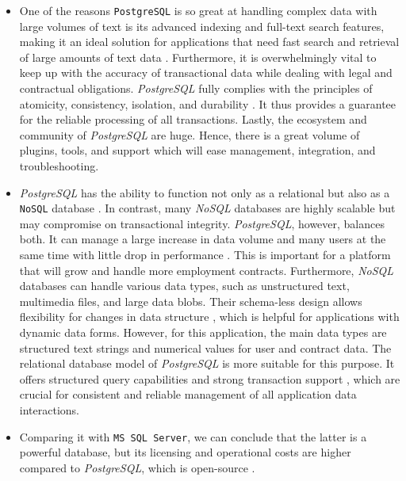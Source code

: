 \begin{itemize}
    \item One of the reasons \texttt{PostgreSQL} is so great at handling complex data with large volumes of text is its advanced indexing and full-text search features, making it an ideal solution for applications that need fast search and retrieval of large amounts of text data \cite{WorsleyEtAl2002}. Furthermore, it is overwhelmingly vital to keep up with the accuracy of transactional data while dealing with legal and contractual obligations. \textit{PostgreSQL} fully complies with the principles of atomicity, consistency, isolation, and durability \cite{JubaEtAl2015}. It thus provides a guarantee for the reliable processing of all transactions. Lastly, the ecosystem and community of \textit{PostgreSQL} are huge. Hence, there is a great volume of plugins, tools, and support \cite{FotacheEtAl2013} which will ease management, integration, and troubleshooting. 
    \item \textit{PostgreSQL} has the ability to function not only as a relational but also as a \texttt{NoSQL} database \cite{TruskowskiEtAl2020}. In contrast, many \textit{NoSQL} databases are highly scalable but may compromise on transactional integrity. \textit{PostgreSQL}, however, balances both. It can manage a large increase in data volume and many users at the same time with little drop in performance \cite{DouglasEtAl2003, TruskowskiEtAl2020, FotacheEtAl2013}. This is important for a platform that will grow and handle more employment contracts. Furthermore, \textit{NoSQL} databases can handle various data types, such as unstructured text, multimedia files, and large data blobs. Their schema-less design allows flexibility for changes in data structure \cite{FotacheEtAl2013}, which is helpful for applications with dynamic data forms. However, for this application, the main data types are structured text strings and numerical values for user and contract data. The relational database model of \textit{PostgreSQL} is more suitable for this purpose. It offers structured query capabilities and strong transaction support \cite{WorsleyEtAl2002, TruskowskiEtAl2020, FotacheEtAl2013}, which are crucial for consistent and reliable management of all application data interactions.
    \item Comparing it with \texttt{MS SQL Server}, we can conclude that the latter is a powerful database, but its licensing and operational costs are higher compared to \textit{PostgreSQL}, which is open-source \cite{TruskowskiEtAl2020, FotacheEtAl2013}. 
\end{itemize}

